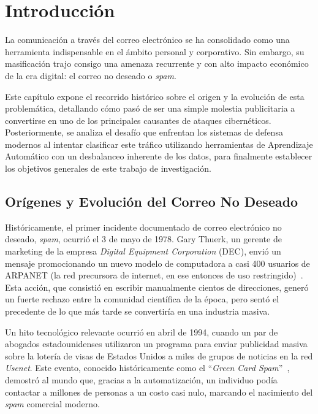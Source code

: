 \documentclass[a4paper,11pt ,openany]{book}
\begin{document}
\chapter{Introducción}
\label{ch:introducción}


La comunicación a través del correo electrónico se ha consolidado como una herramienta indispensable en el ámbito personal y corporativo. Sin embargo, su masificación trajo consigo una amenaza recurrente y con alto impacto económico de la era digital: el correo no deseado o \textit{spam}.

Este capítulo expone el recorrido histórico sobre el origen y la evolución de esta problemática, detallando cómo pasó de ser una simple molestia publicitaria a convertirse en uno de los principales causantes de ataques cibernéticos. Posteriormente, se analiza el desafío que enfrentan los sistemas de defensa modernos al intentar clasificar este tráfico utilizando herramientas de Aprendizaje Automático con un desbalanceo inherente de los datos, para finalmente establecer los objetivos generales de este trabajo de investigación.

\section{Orígenes y Evolución del Correo No Deseado}

Históricamente, el primer incidente documentado de correo electrónico no deseado, \textit{spam}, ocurrió el 3 de mayo de 1978. Gary Thuerk, un gerente de marketing de la empresa \textit{Digital Equipment Corporation} (DEC), envió un mensaje promocionando un nuevo modelo de computadora a casi 400 usuarios de ARPANET (la red precursora de internet, en ese entonces de uso restringido)~\cite{templeton1978spam}. Esta acción, que consistió en escribir manualmente cientos de direcciones, generó un fuerte rechazo entre la comunidad científica de la época, pero sentó el precedente de lo que más tarde se convertiría en una industria masiva.

Un hito tecnológico relevante ocurrió en abril de 1994, cuando un par de abogados estadounidenses utilizaron un programa para enviar publicidad masiva sobre la lotería de visas de Estados Unidos a miles de grupos de noticias en la red \textit{Usenet}. Este evento, conocido históricamente como el ``\textit{Green Card Spam}''~\cite{wired1999greencard}, demostró al mundo que, gracias a la automatización, un individuo podía contactar a millones de personas a un costo casi nulo, marcando el nacimiento del \textit{spam} comercial moderno. 
\end{document}
